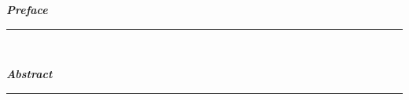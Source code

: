 \thispagestyle{empty}
\begin{center}
   \fontsize{15pt}{12pt}\selectfont \textit{\textbf{Preface}}\\
    \rule{\textwidth}{.05cm}\\[.5ex]
    \lipsum[75]
\end{center}
\vspace*{\fill}
\begin{center}
   \fontsize{15pt}{12pt}\selectfont \textit{\textbf{Abstract}}\\
   \rule{\textwidth}{.05cm}\\[.5ex]
   \lipsum[66]
\end{center}
\restoregeometry